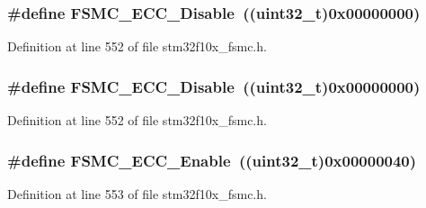 \subsubsection[{\texorpdfstring{F\+S\+M\+C\+\_\+\+E\+C\+C\+\_\+\+Disable}{FSMC_ECC_Disable}}]{\setlength{\rightskip}{0pt plus 5cm}\#define F\+S\+M\+C\+\_\+\+E\+C\+C\+\_\+\+Disable~(({\bf uint32\+\_\+t})0x00000000)}\hypertarget{group___f_s_m_c___e_c_c_ga9a3264c0718f5023fd106abea7ef806d}{}\label{group___f_s_m_c___e_c_c_ga9a3264c0718f5023fd106abea7ef806d}


Definition at line 552 of file stm32f10x\+\_\+fsmc.\+h.

\subsubsection[{\texorpdfstring{F\+S\+M\+C\+\_\+\+E\+C\+C\+\_\+\+Disable}{FSMC_ECC_Disable}}]{\setlength{\rightskip}{0pt plus 5cm}\#define F\+S\+M\+C\+\_\+\+E\+C\+C\+\_\+\+Disable~(({\bf uint32\+\_\+t})0x00000000)}\hypertarget{group___f_s_m_c___e_c_c_ga9a3264c0718f5023fd106abea7ef806d}{}\label{group___f_s_m_c___e_c_c_ga9a3264c0718f5023fd106abea7ef806d}


Definition at line 552 of file stm32f10x\+\_\+fsmc.\+h.

\subsubsection[{\texorpdfstring{F\+S\+M\+C\+\_\+\+E\+C\+C\+\_\+\+Enable}{FSMC_ECC_Enable}}]{\setlength{\rightskip}{0pt plus 5cm}\#define F\+S\+M\+C\+\_\+\+E\+C\+C\+\_\+\+Enable~(({\bf uint32\+\_\+t})0x00000040)}\hypertarget{group___f_s_m_c___e_c_c_ga9d940243830695412d4c98228bb5b763}{}\label{group___f_s_m_c___e_c_c_ga9d940243830695412d4c98228bb5b763}


Definition at line 553 of file stm32f10x\+\_\+fsmc.\+h.

